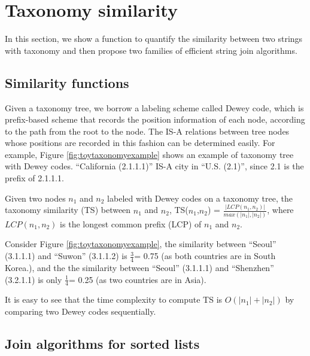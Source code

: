 \section{Taxonomy similarity}

In this section, we show a function to quantify the similarity between two strings with taxonomy and then propose two families of efficient string join algorithms.


\subsection{Similarity functions}

Given a taxonomy tree, we borrow a labeling scheme called Dewey code, which is prefix-based scheme that records the position information of each node, according to the path from the root to the node. The IS-A relations between tree nodes whose positions are recorded in this fashion can be determined easily. For example, Figure \ref{fig:toytaxonomyexample} shows an example of taxonomy tree with Dewey codes. ``\textsf{California} (2.1.1.1)'' IS-A city in ``\textsf{U.S.} (2.1)'', since 2.1 is the prefix of 2.1.1.1.


\begin{definition}
Given two nodes $n_1$ and $n_2$ labeled with Dewey codes on a taxonomy tree, the taxonomy similarity (TS) between $n_1$ and $n_2$, TS($n_1$,$n_2$) = $\frac{|LCP(n_1,n_2)|}{max(|n_1|,|n_2|)}$, where $LCP(n_1,n_2)$  is the longest common prefix (LCP) of  $n_1$ and $n_2$.
 \end{definition}
\smallskip
\smallskip

\begin{example}
Consider Figure \ref{fig:toytaxonomyexample}, the similarity between ``\textsf{Seoul}'' (3.1.1.1) and ``\textsf{Suwon}'' (3.1.1.2) is $\frac{3}{4}$= 0.75 (as both countries are in South Korea.), and the the similarity between ``\textsf{Seoul}''  (3.1.1.1) and ``\textsf{Shenzhen}'' (3.2.1.1) is only $\frac{1}{4}$= 0.25 (as two countries are in Asia).
\end{example}


 It is easy to see that the time complexity to compute TS is $O(|n_1|+|n_2|)$ by comparing two Dewey codes sequentially.


\subsection{Join algorithms for sorted lists}

